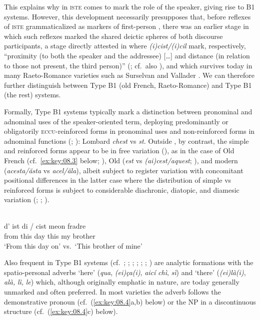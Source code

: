 \documentclass[output=paper]{langsci/langscibook}
\begin{document}
This explains why in  \textsc{iste} comes to mark the role of the
speaker, giving rise to \textsc{B1} systems. However, this development
necessarily presupposes that, before reflexes of \textsc{iste} grammaticalized
as markers of first-person , there was an earlier stage in which such
reflexes marked the shared deictic spheres of both discourse participants, a
stage directly attested in  where \emph{(i)cist/(i)cil} mark,
respectively, \enquote{proximity (to both the speaker and the addressee)
[\dots] and distance (in relation to those not present, the third person)}
(\citealt[s.v.\ ce2]{CNRTL:aa}; cf.\ also \citealt[293f]{Nyrop:1925ab}), and
which survives today in many Raeto-Romance varieties such as Surselvan and
Vallader \citep[§2.2.1.1]{Sornicola:2011a}. We can therefore further
distinguish be\-tween Type B1 (old French, Raeto-Romance) and Type
B1 (the rest) systems.

Formally,  Type B1 systems typically mark a distinction
between pronominal and adnominal uses of the speaker-oriented term, deploying
predominantly or obligatorily \textsc{eccu}{}-reinforced forms in pronominal
uses and non-reinforced forms in adnominal functions
(\citealt[206]{Rohlfs:1968a}; \citealt[13f]{Irsara:2009a}): Lombard
\emph{chest} vs \emph{st}. Outside , by contrast, the simple
and reinforced forms appear to be in free variation
(\citealt[§2.2.1.1]{Sornicola:2011a}), as in the case of Old French (cf.\
\eqref{ex:key:08.3} below; \citealt[416]{Nyrop:1925a}), Old 
(\emph{est} vs \emph{(ai)cest/aquest}; \citealt[109]{Grandgent:1909a}), and
modern \ili{Romanian} (\emph{acesta/ăsta} vs \emph{acel/ăla}), albeit subject
to register variation with concomitant positional differences in the latter
case where the distribution of simple vs reinforced forms is subject to
considerable diachronic, diatopic, and diamesic variation (\citealt[157,
161f]{Sandfeld:2019a}; \citealt[418]{Caragiu-Marioteanu:1989a};
\citealt[503--505]{Manea:2012a}).

\ea\label{bkm:Ref370483902}\langinfo{Old French}{}{\emph{Strasbourg}
\emph{Oaths}}\label{ex:key:08.3}\\
\gll d’  ist  di \textup{\quad /\quad}  cist  meon  fradre  \\
from  this  day {} this  my  brother\\
\glt    \enquote*{From this day on} vs.\ \enquote*{This brother of mine}\z

Also frequent in Type B1 systems (cf.\ \citealt[282f]{Arnaud:1920a};
\citealt[112]{Vanelli:1997a}; \citealt[84, 182]{Marcato:1998a};
\citealt[65]{Salvat:1998a}; \citealt{Bernstein1997}; \citealt[34--48,
107f]{Irsara:2009a}; \citealt{Cordin:2016a}) are analytic formations with the
spatio-personal adverbs ‘here’ (\emph{qua}, \emph{(ei)ça(i)}, \emph{aicí}
\emph{chì}, \emph{sì}) and ‘there’ (\emph{(ei)là(i)}, \emph{alà,} \emph{lì,}
\emph{le}) which, although originally emphatic in nature, are today generally
unmarked and often preferred. In most varieties the adverb follows the
demonstrative pronoun (cf.\ (\ref{ex:key:08.4}a,b) below) or the NP in a
discontinuous structure (cf.\ (\ref{ex:key:08.4}c) below).
\end{document}
